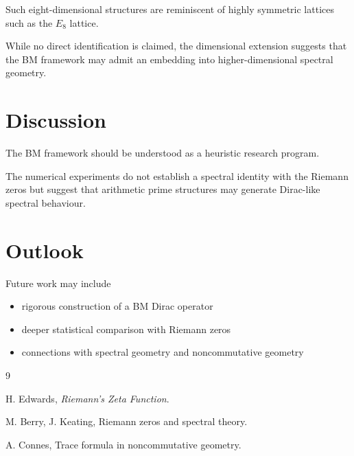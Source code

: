 \documentclass[11pt,a4paper]{article}
\begin{document}
	Such eight-dimensional structures are reminiscent
	of highly symmetric lattices such as the
	$E_8$ lattice.
	
	While no direct identification is claimed,
	the dimensional extension suggests that the
	BM framework may admit an embedding into
	higher-dimensional spectral geometry.
	
	\section{Discussion}
	
	The BM framework should be understood as a
	heuristic research program.
	
	The numerical experiments do not establish
	a spectral identity with the Riemann zeros
	but suggest that arithmetic prime structures
	may generate Dirac-like spectral behaviour.
	
	\section{Outlook}
	
	Future work may include
	
	\begin{itemize}
		
		\item rigorous construction of a BM Dirac operator
		
		\item deeper statistical comparison with Riemann zeros
		
		\item connections with spectral geometry
		and noncommutative geometry
		
	\end{itemize}
	
	\begin{thebibliography}{9}
		
		H. Edwards,
		\textit{Riemann's Zeta Function}.
		
		M. Berry, J. Keating,
		Riemann zeros and spectral theory.
		
		A. Connes,
		Trace formula in noncommutative geometry.
		
	\end{thebibliography}
	
\end{document}
